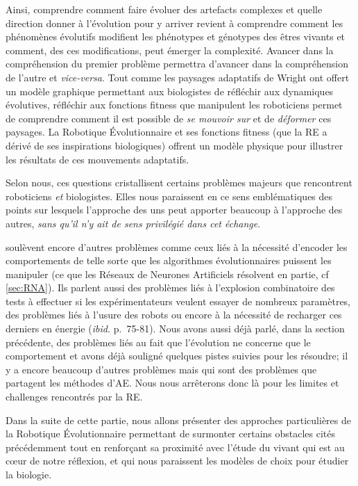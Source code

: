 Ainsi, comprendre comment faire évoluer des artefacts complexes et quelle direction donner à l'évolution pour y arriver revient à comprendre comment les phénomènes évolutifs modifient les phénotypes et génotypes des êtres vivants et comment, des ces modifications, peut émerger la complexité. Avancer dans la compréhension du premier problème permettra d'avancer dans la compréhension de l'autre et \emph{vice-versa}.
Tout comme les paysages adaptatifs de Wright ont offert un modèle graphique permettant aux biologistes de réfléchir aux dynamiques évolutives, réfléchir aux fonctions fitness que manipulent les roboticiens permet de comprendre comment il est possible de \emph{se mouvoir sur} et de \emph{déformer} ces paysages. La Robotique \'Evolutionnaire et ses fonctions fitness (que la RE a dérivé de ses inspirations biologiques) offrent un modèle physique pour illustrer les résultats de ces mouvements adaptatifs.

Selon nous, ces questions cristallisent certains problèmes majeurs que rencontrent roboticiens \emph{et} biologistes. Elles nous paraissent en ce sens emblématiques des points sur lesquels l'approche des uns peut apporter beaucoup à l'approche des autres, \emph{sans qu'il n'y ait de sens privilégié dans cet échange}.

\cite{mataric96challengesinevolvingcontrollersforphysicalrobots} soulèvent encore d'autres problèmes comme ceux liés à la nécessité d'encoder les comportements de telle sorte que les algorithmes évolutionnaires puissent les manipuler (ce que les Réseaux de Neurones Artificiels résolvent en partie, cf \ref{sec:RNA}). Ils parlent aussi des problèmes liés à l'explosion combinatoire des tests à effectuer si les expérimentateurs veulent essayer de nombreux paramètres, des problèmes liés à l'usure des robots ou encore à la nécessité de recharger ces derniers en énergie (\emph{ibid.} p.~75-81).  Nous avons aussi déjà parlé, dans la section précédente, des problèmes liés au fait que l'évolution ne concerne que le comportement et avons déjà souligné quelques pistes suivies pour les résoudre;  il y a encore beaucoup d'autres problèmes mais qui sont des problèmes que partagent les méthodes d'AE. Nous nous arrêterons donc là pour les limites et challenges rencontrés par la RE.

Dans la suite de cette partie, nous allons présenter des approches particulières de la Robotique \'Evolutionnaire  permettant de surmonter certains obstacles cités précédemment tout en renforçant sa proximité avec l'étude du vivant qui est au c{\oe}ur de notre réflexion, et qui nous paraissent les modèles de choix pour étudier la biologie.

